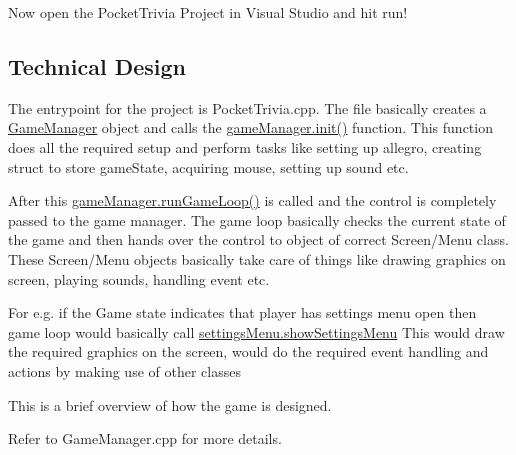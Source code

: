 Now open the Pocket\+Trivia Project in Visual Studio and hit run!

\subsection*{Technical Design}

The entrypoint for the project is Pocket\+Trivia.\+cpp. The file basically creates a \mbox{\hyperlink{class_game_manager}{Game\+Manager}} object and calls the \mbox{\hyperlink{class_game_manager_a0b2f746268718b7fccc05c178217fcff}{game\+Manager.init()}} function. This function does all the required setup and perform tasks like setting up allegro, creating struct to store game\+State, acquiring mouse, setting up sound etc.

After this \mbox{\hyperlink{class_game_manager_a7a840d42c2e52b2f827800bbac51c944}{game\+Manager.run\+Game\+Loop()}} is called and the control is completely passed to the game manager. The game loop basically checks the current state of the game and then hands over the control to object of correct Screen/\+Menu class. These Screen/\+Menu objects basically take care of things like drawing graphics on screen, playing sounds, handling event etc.

For e.\+g. if the Game state indicates that player has settings menu open then game loop would basically call \mbox{\hyperlink{class_settings_menu_a5df9575a1e6e76b4159b417e4f66b222}{settings\+Menu.show\+Settings\+Menu}} This would draw the required graphics on the screen, would do the required event handling and actions by making use of other classes

This is a brief overview of how the game is designed.

Refer to Game\+Manager.\+cpp for more details. 